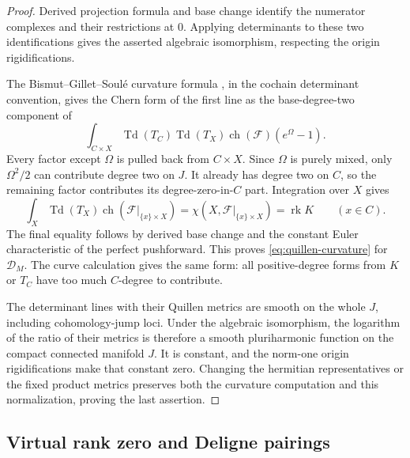 \documentclass[11pt,a4paper]{article}
\newtheorem{theorem}{Theorem}[section]
\theoremstyle{definition}
\theoremstyle{remark}
\newcommand{\rk}{\operatorname{rk}}
\newcommand{\ch}{\operatorname{ch}}
\newcommand{\Td}{\operatorname{Td}}
\newcommand{\cP}{\mathcal P}
\newcommand{\cD}{\mathcal D}
\newcommand{\MathEqref}[1]{\eqref{#1}}
\begin{document}
\begin{proof}
Derived projection formula and base change identify the numerator
complexes and their restrictions at \(0\). Applying determinants
to these two identifications gives the asserted algebraic
isomorphism, respecting the origin rigidifications.

The Bismut--Gillet--Soulé curvature formula
\cite[Theorem~0.1]{BGS}, in the cochain determinant convention,
gives the Chern form of the first line as the base-degree-two
component of
\[
 \int_{C\times X}\Td(T_C)\Td(T_X)\ch(\mathcal F)
                          (e^\Omega-1).
\]
Every factor except \(\Omega\) is pulled back from \(C\times X\).
Since \(\Omega\) is purely mixed, only \(\Omega^2/2\) can
contribute degree two on \(J\). It already has degree two on
\(C\), so the remaining factor contributes its degree-zero-in-\(C\)
part. Integration over \(X\) gives
\[
 \int_X\Td(T_X)\ch(\mathcal F|_{\{x\}\times X})
       =\chi(X,\mathcal F|_{\{x\}\times X})=\rk K
 \qquad(x\in C).
\]
The final equality follows by derived base change and the constant
Euler characteristic of the perfect pushforward. This proves
\MathEqref{eq:quillen-curvature} for \(\cD_M\). The curve
calculation gives the same form: all positive-degree forms from
\(K\) or \(T_C\) have too much \(C\)-degree to contribute.

The determinant lines with their Quillen metrics are smooth on
the whole \(J\), including cohomology-jump loci. Under the
algebraic isomorphism, the logarithm of the ratio of their metrics
is therefore a smooth pluriharmonic function on the compact
connected manifold \(J\). It is constant, and the norm-one
origin rigidifications make that constant zero. Changing the
hermitian representatives or the fixed product metrics preserves both the
curvature computation and this normalization, proving the last
assertion.
\end{proof}

\subsection{Virtual rank zero and Deligne pairings}
\label{sec:deligne-proof}

\end{document}
